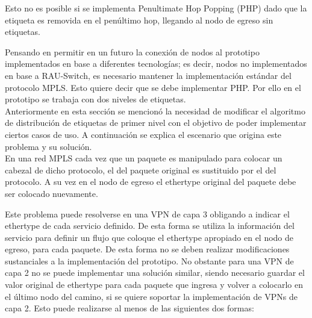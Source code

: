 Esto no es posible si se implementa Penultimate Hop Popping (PHP) dado que la etiqueta es removida en el pen\'ultimo hop, llegando al nodo de egreso sin etiquetas. 

Pensando en permitir en un futuro la conexi\'on de nodos al prototipo implementados en base a diferentes tecnolog\'ias; es decir, nodos no implementados en base a RAU-Switch, es necesario mantener la implementaci\'on estándar del protocolo MPLS. Esto quiere decir que se debe implementar PHP. Por ello en el prototipo se trabaja con dos niveles de etiquetas.\\

Anteriormente en esta secci\'on se mencion\'o la necesidad de modificar el algoritmo de distribución de etiquetas de primer nivel con el objetivo de poder implementar ciertos casos de uso. A continuaci\'on se explica el escenario que origina este problema y su soluci\'on.\\

En una red MPLS cada vez que un paquete es manipulado para colocar un cabezal de dicho protocolo, el  del paquete original es sustituido por el del protocolo. A su vez en el nodo de egreso el ethertype original del paquete debe ser colocado nuevamente. 

Este problema puede resolverse en una VPN de capa 3 obligando a indicar el ethertype de cada servicio definido. De esta forma se utiliza la informaci\'on del servicio para definir un flujo que coloque el ethertype apropiado en el nodo de egreso, para cada paquete. De esta forma no se deben realizar modificaciones sustanciales a la implementaci\'on del prototipo. No obstante para una VPN de capa 2 no se puede implementar una soluci\'on similar, siendo necesario guardar el valor original de ethertype para cada paquete que ingresa y volver a colocarlo en el \'ultimo nodo del camino, si se quiere soportar la implementaci\'on de VPNs de capa 2. Esto puede realizarse al menos de las siguientes dos formas:

